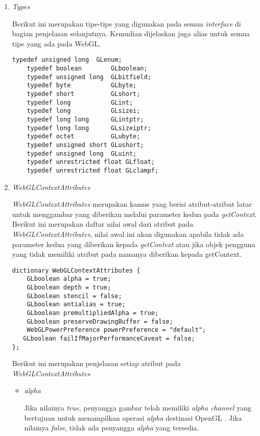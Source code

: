 \begin{enumerate}
\item {\it Types}
 
	Berikut ini merupakan tipe-tipe yang digunakan pada semua {\it interface} di bagian penjelasan selanjutnya. Kemudian dijelaskan juga alias untuk semua tipe yang ada pada WebGL.
	\begin{lstlisting}[caption={Alias untuk tipe pada WebGL.}, captionpos=b]
	typedef unsigned long  GLenum;
	typedef boolean        GLboolean;
	typedef unsigned long  GLbitfield;
	typedef byte           GLbyte;
	typedef short          GLshort;
	typedef long           GLint;
	typedef long           GLsizei;
	typedef long long      GLintptr;
	typedef long long      GLsizeiptr;
	typedef octet          GLubyte;
	typedef unsigned short GLushort;
	typedef unsigned long  GLuint;
	typedef unrestricted float GLfloat;
	typedef unrestricted float GLclampf;
	\end{lstlisting}
	
\item {\it WebGLContextAttributes}

	{\it WebGLContextAttributes} merupakan kamus yang berisi atribut-atribut latar untuk menggambar yang diberikan melalui parameter kedua pada {\it getContext}. Berikut ini merupakan daftar nilai awal dari atribut pada {\it WebGLContextAttributes}, nilai awal ini akan digunakan apabila tidak ada parameter kedua yang diberikan kepada {\it getContext} atau jika objek pengguna yang tidak memiliki atribut pada namanya diberikan kepada getContext. 
	\begin{lstlisting}[caption={Nilai awal pada {\it WebGLContextAttributes} saat tidak ada parameter kedua yang diberikan.}, captionpos=b]
dictionary WebGLContextAttributes {
    GLboolean alpha = true;
    GLboolean depth = true;
    GLboolean stencil = false;
    GLboolean antialias = true;
    GLboolean premultipliedAlpha = true;
    GLboolean preserveDrawingBuffer = false;
    WebGLPowerPreference powerPreference = "default";
   GLboolean failIfMajorPerformanceCaveat = false;
};
	\end{lstlisting}
	Berikut ini merupakan penjelasan setiap atribut pada {\it WebGLContextAttributes} 
	\begin{itemize}
	\item {\it alpha}
	
	Jika nilainya {\it true}, penyangga gambar telah memiliki {\it alpha channel} yang bertujuan untuk menampilkan operasi {\it alpha} destinasi OpenGL . Jika nilainya {\it false}, tidak ada penyangga {\it alpha} yang tersedia.
	

\end{itemize}
\end{enumerate}
